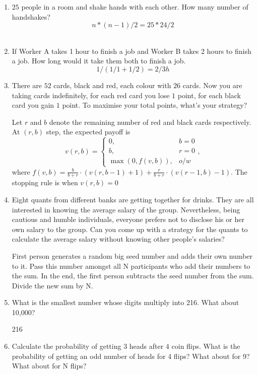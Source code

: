 \documentclass{article}
\begin{document}
\begin{enumerate}
    \item $25$ people in a room and shake hands with each other. How many number of handshakes? 
    $$n*(n-1)/2 = 25*24/2$$ \\

    \item If Worker A takes 1 hour to finish a job and Worker B takes 2 hours to finish a job. How long would it take them both to finish a job.
    $$1/(1/1 + 1/2) = 2/3 h$$

    \item There are $52$ cards, black and red, each colour with $26$ cards. Now you are taking cards indefinitely, for each red card you lose $1$ point, for each black card you gain $1$ point. To maximise your total points, what's your strategy?

    Let $r$ and $b$ denote the remaining number of red and black cards respectively. At $(r,b)$ step, the expected payoff is 
    $$v(r,b) = \begin{cases}
        0, & b=0 \\
        b, & r=0 \\
        \max(0, f(v,b)),& o/w
    \end{cases},$$
    where $f(v,b) = \frac{b}{b+r}\cdot (v(r,b-1)+1) + \frac{r}{b+r}\cdot (v(r-1,b)-1)$. The stopping rule is when $v(r,b) = 0$

    \item Eight quants from different banks are getting together for drinks. They are all interested in knowing the average salary of the group. Nevertheless, being cautious and humble individuals, everyone prefers not to disclose his or her own salary to the group. Can you come up with a strategy for the quants to calculate the average salary without knowing other people's salaries?

    First person generates a random big seed number and adds their own number to it. Pass this number amongst all N participants who add their numbers to the sum. In the end, the first person subtracts the seed number from the sum. Divide the new sum by N.

    \item What is the smallest number whose digits multiply into 216. What about 10,000?

    216

    \item Calculate the probability of getting 3 heads after 4 coin flips. What is the probability of getting an odd number of heads for 4 flips? What about for 9? What about for N flips?



\end{enumerate}
\end{document}

